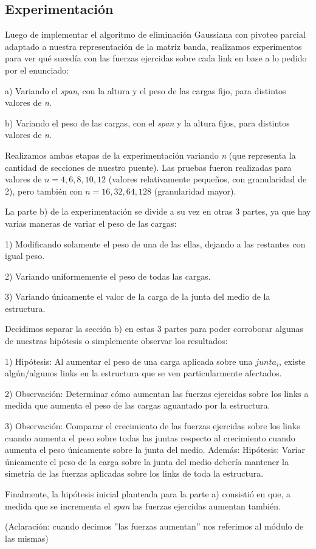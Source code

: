 \subsection{Experimentación}

Luego de implementar el algoritmo de eliminación Gaussiana con pivoteo parcial adaptado a nuestra representación de la matriz banda,
realizamos experimentos para ver qué sucedía con las fuerzas ejercidas sobre cada link en base a lo pedido por el enunciado:

a) Variando el \emph{span}, con la altura y el peso de las cargas fijo, para distintos valores de \emph{n}.

b) Variando el peso de las cargas, con el \emph{span} y la altura fijos, para distintos valores de \emph{n}.

Realizamos ambas etapas de la experimentación variando \emph{n} (que representa la cantidad de secciones de nuestro puente).
Las pruebas fueron realizadas para valores de $n= 4,6,8,10,12$ (valores relativamente peque\~nos, con granularidad de 2), pero 
también con $n=16,32,64,128$ (granularidad mayor).

La parte b) de la experimentación se divide a su vez en otras 3 partes, ya que hay varias maneras de variar el peso de las cargas: 

1) Modificando solamente el peso de una de las ellas, dejando a las restantes con igual peso.

2) Variando uniformemente el peso de todas las cargas.

3) Variando únicamente el valor de la carga de la junta del medio de la estructura.

Decidimos separar la sección b) en estas 3 partes para poder corroborar algunas de nuestras hipótesis o simplemente observar 
los resultados:

1) Hipótesis: Al aumentar el peso de una carga aplicada sobre una $junta_{i}$, existe algún/algunos links en la estructura que se ven
particularmente afectados.

2) Observación: Determinar cómo aumentan las fuerzas ejercidas sobre los links a medida que aumenta
el peso de las cargas aguantado por la estructura.

3) Observación: Comparar el crecimiento de las fuerzas ejercidas sobre los links cuando aumenta el peso sobre todas las juntas respecto al
crecimiento cuando aumenta el peso únicamente sobre la junta del medio. Además:
Hipótesis: Variar únicamente el peso de la carga sobre la junta del medio debería mantener la simetría de las fuerzas aplicadas sobre
los links de toda la estructura.

Finalmente, la hipótesis inicial planteada para la parte a) consistió en que, a medida que se incrementa el \emph{span} las fuerzas
ejercidas aumentan también.

(Aclaración: cuando decimos ''las fuerzas aumentan'' nos referimos al módulo de las mismas)

